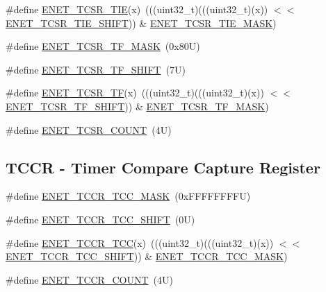 \begin{DoxyCompactItemize}
\item 
\#define \mbox{\hyperlink{group___e_n_e_t___register___masks_ga26ee3b20a0e34a8bbe58acab1931c4be}{E\+N\+E\+T\+\_\+\+T\+C\+S\+R\+\_\+\+T\+IE}}(x)~(((uint32\+\_\+t)(((uint32\+\_\+t)(x)) $<$$<$ \mbox{\hyperlink{group___e_n_e_t___register___masks_ga35fcee5f4e7c9e5b69af4039ee4fa537}{E\+N\+E\+T\+\_\+\+T\+C\+S\+R\+\_\+\+T\+I\+E\+\_\+\+S\+H\+I\+FT}})) \& \mbox{\hyperlink{group___e_n_e_t___register___masks_ga1a36ae4a9731e381fa9159387670143f}{E\+N\+E\+T\+\_\+\+T\+C\+S\+R\+\_\+\+T\+I\+E\+\_\+\+M\+A\+SK}})
\item 
\#define \mbox{\hyperlink{group___e_n_e_t___register___masks_ga79d70e9a593487d29ce2e6b9c9021c59}{E\+N\+E\+T\+\_\+\+T\+C\+S\+R\+\_\+\+T\+F\+\_\+\+M\+A\+SK}}~(0x80\+U)
\item 
\#define \mbox{\hyperlink{group___e_n_e_t___register___masks_gaa0ab6243262f645ae70f481ba9c33203}{E\+N\+E\+T\+\_\+\+T\+C\+S\+R\+\_\+\+T\+F\+\_\+\+S\+H\+I\+FT}}~(7\+U)
\item 
\#define \mbox{\hyperlink{group___e_n_e_t___register___masks_gaaa56823f6455c120c2106368cbb81200}{E\+N\+E\+T\+\_\+\+T\+C\+S\+R\+\_\+\+TF}}(x)~(((uint32\+\_\+t)(((uint32\+\_\+t)(x)) $<$$<$ \mbox{\hyperlink{group___e_n_e_t___register___masks_gaa0ab6243262f645ae70f481ba9c33203}{E\+N\+E\+T\+\_\+\+T\+C\+S\+R\+\_\+\+T\+F\+\_\+\+S\+H\+I\+FT}})) \& \mbox{\hyperlink{group___e_n_e_t___register___masks_ga79d70e9a593487d29ce2e6b9c9021c59}{E\+N\+E\+T\+\_\+\+T\+C\+S\+R\+\_\+\+T\+F\+\_\+\+M\+A\+SK}})
\item 
\#define \mbox{\hyperlink{group___e_n_e_t___register___masks_ga64a23387d526b0cc5bb083167cfdc2e8}{E\+N\+E\+T\+\_\+\+T\+C\+S\+R\+\_\+\+C\+O\+U\+NT}}~(4\+U)
\end{DoxyCompactItemize}
\subsection*{T\+C\+CR -\/ Timer Compare Capture Register}
\begin{DoxyCompactItemize}
\item 
\#define \mbox{\hyperlink{group___e_n_e_t___register___masks_ga6f9999013e2cb91eaf8ebbdc67ca9fe8}{E\+N\+E\+T\+\_\+\+T\+C\+C\+R\+\_\+\+T\+C\+C\+\_\+\+M\+A\+SK}}~(0x\+F\+F\+F\+F\+F\+F\+F\+F\+U)
\item 
\#define \mbox{\hyperlink{group___e_n_e_t___register___masks_ga72e171b218136489e1e0b5dcb7aefab7}{E\+N\+E\+T\+\_\+\+T\+C\+C\+R\+\_\+\+T\+C\+C\+\_\+\+S\+H\+I\+FT}}~(0\+U)
\item 
\#define \mbox{\hyperlink{group___e_n_e_t___register___masks_ga7b276385d78bf216e8b3c0efb45d2f87}{E\+N\+E\+T\+\_\+\+T\+C\+C\+R\+\_\+\+T\+CC}}(x)~(((uint32\+\_\+t)(((uint32\+\_\+t)(x)) $<$$<$ \mbox{\hyperlink{group___e_n_e_t___register___masks_ga72e171b218136489e1e0b5dcb7aefab7}{E\+N\+E\+T\+\_\+\+T\+C\+C\+R\+\_\+\+T\+C\+C\+\_\+\+S\+H\+I\+FT}})) \& \mbox{\hyperlink{group___e_n_e_t___register___masks_ga6f9999013e2cb91eaf8ebbdc67ca9fe8}{E\+N\+E\+T\+\_\+\+T\+C\+C\+R\+\_\+\+T\+C\+C\+\_\+\+M\+A\+SK}})
\item 
\#define \mbox{\hyperlink{group___e_n_e_t___register___masks_ga435749bf8deea9f565098dfe4126ec95}{E\+N\+E\+T\+\_\+\+T\+C\+C\+R\+\_\+\+C\+O\+U\+NT}}~(4\+U)
\end{DoxyCompactItemize}


